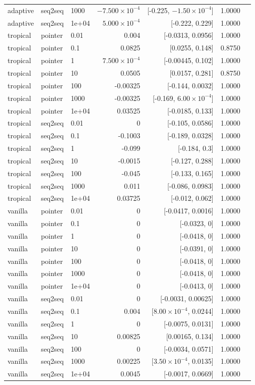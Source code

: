 \documentclass[10pt]{article}
\begin{document}
{\begin{longtable}{lllrrrl}
adaptive & seq2seq & 1000 & $-7.500\times10^{-4}$ & [-0.225, $-1.50\times10^{-4}$] & 1.0000 & \\
adaptive & seq2seq & 1e+04 & $5.000\times10^{-4}$ & [-0.222, 0.229] & 1.0000 & \\
tropical & pointer & 0.01 & 0.004 & [-0.0313, 0.0956] & 1.0000 & \\
tropical & pointer & 0.1 & 0.0825 & [0.0255, 0.148] & 0.8750 & \\
tropical & pointer & 1 & $7.500\times10^{-4}$ & [-0.00445, 0.102] & 1.0000 & \\
tropical & pointer & 10 & 0.0505 & [0.0157, 0.281] & 0.8750 & \\
tropical & pointer & 100 & -0.00325 & [-0.144, 0.0032] & 1.0000 & \\
tropical & pointer & 1000 & -0.00325 & [-0.169, $6.00\times10^{-4}$] & 1.0000 & \\
tropical & pointer & 1e+04 & 0.03525 & [-0.0185, 0.133] & 1.0000 & \\
tropical & seq2seq & 0.01 & 0 & [-0.105, 0.0586] & 1.0000 & \\
tropical & seq2seq & 0.1 & -0.1003 & [-0.189, 0.0328] & 1.0000 & \\
tropical & seq2seq & 1 & -0.099 & [-0.184, 0.3] & 1.0000 & \\
tropical & seq2seq & 10 & -0.0015 & [-0.127, 0.288] & 1.0000 & \\
tropical & seq2seq & 100 & -0.045 & [-0.133, 0.165] & 1.0000 & \\
tropical & seq2seq & 1000 & 0.011 & [-0.086, 0.0983] & 1.0000 & \\
tropical & seq2seq & 1e+04 & 0.03725 & [-0.012, 0.062] & 1.0000 & \\
vanilla & pointer & 0.01 & 0 & [-0.0417, 0.0016] & 1.0000 & \\
vanilla & pointer & 0.1 & 0 & [-0.0323, 0] & 1.0000 & \\
vanilla & pointer & 1 & 0 & [-0.0418, 0] & 1.0000 & \\
vanilla & pointer & 10 & 0 & [-0.0391, 0] & 1.0000 & \\
vanilla & pointer & 100 & 0 & [-0.0418, 0] & 1.0000 & \\
vanilla & pointer & 1000 & 0 & [-0.0418, 0] & 1.0000 & \\
vanilla & pointer & 1e+04 & 0 & [-0.0413, 0] & 1.0000 & \\
vanilla & seq2seq & 0.01 & 0 & [-0.0031, 0.00625] & 1.0000 & \\
vanilla & seq2seq & 0.1 & 0.004 & [$8.00\times10^{-4}$, 0.0244] & 1.0000 & \\
vanilla & seq2seq & 1 & 0 & [-0.0075, 0.0131] & 1.0000 & \\
vanilla & seq2seq & 10 & 0.00825 & [0.00165, 0.134] & 1.0000 & \\
vanilla & seq2seq & 100 & 0 & [-0.0034, 0.0571] & 1.0000 & \\
vanilla & seq2seq & 1000 & 0.00225 & [$3.50\times10^{-4}$, 0.0135] & 1.0000 & \\
vanilla & seq2seq & 1e+04 & 0.0045 & [-0.0017, 0.0669] & 1.0000 & \\
\bottomrule
\end{longtable}
}
\end{document}

